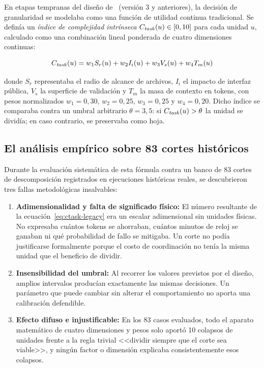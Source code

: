 En etapas tempranas del diseño de \sistema\ (versión 3 y anteriores), la decisión de granularidad se modelaba como una función de utilidad continua tradicional. Se definía un \emph{índice de complejidad intrínseca} $C_{\mathit{task}}(u) \in [0, 10]$ para cada unidad $u$, calculado como una combinación lineal ponderada de cuatro dimensiones continuas:

\begin{equation}
C_{\mathit{task}}(u) = w_1 S_r(u) + w_2 I_i(u) + w_3 V_s(u) + w_4 T_m(u)
\label{eq:ctask-legacy}
\end{equation}

\noindent donde $S_r$ representaba el radio de alcance de archivos, $I_i$ el impacto de interfaz pública, $V_s$ la superficie de validación y $T_m$ la masa de contexto en tokens, con pesos normalizados $w_1 = 0{,}30$, $w_2 = 0{,}25$, $w_3 = 0{,}25$ y $w_4 = 0{,}20$. Dicho índice se comparaba contra un umbral arbitrario $\theta = 3{,}5$: si $C_{\mathit{task}}(u) > \theta$ la unidad se dividía; en caso contrario, se preservaba como hoja.

\subsection{El análisis empírico sobre 83 cortes históricos}

Durante la evaluación sistemática de esta fórmula contra un banco de 83 cortes de descomposición registrados en ejecuciones históricas reales, se descubrieron tres fallas metodológicas insalvables:

\begin{enumerate}
  \item \textbf{Adimensionalidad y falta de significado físico:} El número resultante de la ecuación~\ref{eq:ctask-legacy} era un escalar adimensional sin unidades físicas. No expresaba cuántos tokens se ahorraban, cuántos minutos de reloj se ganaban ni qué probabilidad de fallo se mitigaba. Un corte no podía justificarse formalmente porque el costo de coordinación no tenía la misma unidad que el beneficio de dividir.
  \item \textbf{Insensibilidad del umbral:} Al recorrer los valores previstos por el diseño, amplios intervalos producían exactamente las mismas decisiones. Un parámetro que puede cambiar sin alterar el comportamiento no aporta una calibración defendible.
  \item \textbf{Efecto difuso e injustificable:} En los 83 casos evaluados, todo el aparato matemático de cuatro dimensiones y pesos solo aportó 10 colapsos de unidades frente a la regla trivial <<dividir siempre que el corte sea viable>>, y ningún factor o dimensión explicaba consistentemente esos colapsos.
\end{enumerate}

